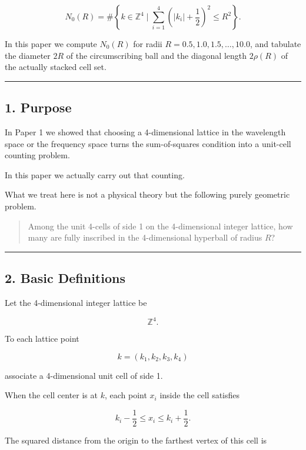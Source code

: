 \documentclass[
]{article}
\begin{document}
\[
N_0(R)
=
\#\left\{
k\in\mathbb{Z}^4
\mid
\sum_{i=1}^{4}
\left(|k_i|+\frac12\right)^2
\le R^2
\right\} .
\]

In this paper we compute \(N_0(R)\) for radii
\(R=0.5,1.0,1.5,\ldots,10.0\), and tabulate the diameter \(2R\) of the
circumscribing ball and the diagonal length \(2\rho(R)\) of the actually
stacked cell set.

\begin{center}\rule{0.5\linewidth}{0.5pt}\end{center}

\subsection{1. Purpose}\label{purpose}

In Paper 1 we showed that choosing a 4-dimensional lattice in the
wavelength space or the frequency space turns the sum-of-squares
condition into a unit-cell counting problem.

In this paper we actually carry out that counting.

What we treat here is not a physical theory but the following purely
geometric problem.

\begin{quote}
Among the unit 4-cells of side 1 on the 4-dimensional integer lattice,
how many are fully inscribed in the 4-dimensional hyperball of radius
\(R\)?
\end{quote}

\begin{center}\rule{0.5\linewidth}{0.5pt}\end{center}

\subsection{2. Basic Definitions}\label{basic-definitions}

Let the 4-dimensional integer lattice be

\[
\mathbb{Z}^4 .
\]

To each lattice point

\[
k=(k_1,k_2,k_3,k_4)
\]

associate a 4-dimensional unit cell of side 1.

When the cell center is at \(k\), each point \(x_i\) inside the cell
satisfies

\[
k_i-\frac12\le x_i\le k_i+\frac12 .
\]

The squared distance from the origin to the farthest vertex of this cell
is
\end{document}
